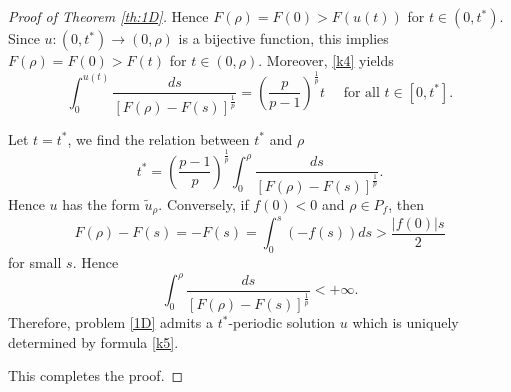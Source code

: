 \documentclass[reqno]{amsart}
\theoremstyle{plain}
\theoremstyle{definition}
\theoremstyle{remark}
\begin{document}
\begin{proof}[Proof of Theorem \ref{th:1D}]
		Hence $F(\rho)=F(0)>F(u(t))$ for $t\in(0,t^*)$. Since $u:(0,t^*)\to(0,\rho)$ is a bijective function, this implies $F(\rho)=F(0)>F(t)$ for $t\in(0,\rho)$. Moreover, \eqref{k4} yields
		\begin{equation}\label{k5}
			\int_{0}^{u(t)} \frac{ds}{\left[F(\rho)-F(s)\right]^\frac{1}{p}} = \left(\frac{p}{p-1}\right)^\frac{1}{p}t \quad\text{ for all } t\in[0,t^*].
		\end{equation}
		
		Let $t=t^*$, we find the relation between $t^*$ and $\rho$
		\[
		t^* = \left(\frac{p-1}{p}\right)^\frac{1}{p}\int_{0}^{\rho} \frac{ds}{\left[F(\rho)-F(s)\right]^\frac{1}{p}}.
		\]
		Hence $u$ has the form $\tilde u_\rho$. Conversely, if $f(0)<0$ and $\rho\in P_f$, then
		\[
		F(\rho)-F(s) = -F(s) = \int_{0}^{s} (-f(s))ds > \frac{|f(0)|s}{2}
		\]
		for small $s$. Hence
		\[
		\int_{0}^{\rho} \frac{ds}{\left[F(\rho)-F(s)\right]^\frac{1}{p}} < +\infty.
		\]
		Therefore, problem \eqref{1D} admits a $t^*$-periodic solution $u$ which is uniquely determined by formula \eqref{k5}.
		
		This completes the proof.
	\end{proof}
	
\end{document}
